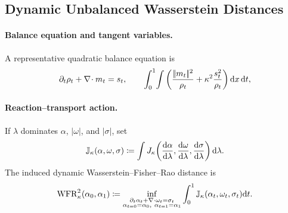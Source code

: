 \subsection{Dynamic Unbalanced Wasserstein Distances}
\label{sec-unbalanced-ot}
\paragraph{Balance equation and tangent variables.}
A representative quadratic balance equation is
\[
\partial_t\rho_t+\nabla\!\cdot m_t=s_t,
\qquad
\int_0^1\!\int
\left(\frac{|\!| m_t |\!|^2}{\rho_t}+\kappa^2\frac{s_t^2}{\rho_t}\right)\mathrm{d} x\,\mathrm{d} t,
\]
\paragraph{Reaction--transport action.}
\begin{defn}\label{def-dynamic-wfr-distance}
If $\lambda$ dominates $\alpha$, $|\omega|$, and $|\sigma|$, set
\begin{equation}\label{eq-wfr-measure-action}
\mathbb J_\kappa(\alpha,\omega,\sigma)
\coloneqq
\int J_\kappa\!\left(\frac{\mathrm{d}\alpha}{\mathrm{d}\lambda},
\frac{\mathrm{d}\omega}{\mathrm{d}\lambda},\frac{\mathrm{d}\sigma}{\mathrm{d}\lambda}\right)\mathrm{d}\lambda.
\end{equation}
The induced dynamic Wasserstein--Fisher--Rao distance is
\begin{equation}\label{eq-dynamic-unbalanced-ot}
\operatorname{WFR}_\kappa^2(\alpha_0,\alpha_1)
\coloneqq
\inf_{\substack{\partial_t\alpha_t+\nabla\cdot\omega_t=\sigma_t\\
\alpha_{t=0}=\alpha_0,\ \alpha_{t=1}=\alpha_1}}
\int_0^1\mathbb J_\kappa(\alpha_t,\omega_t,\sigma_t)\mathrm{d} t.
\end{equation}
\end{defn}
